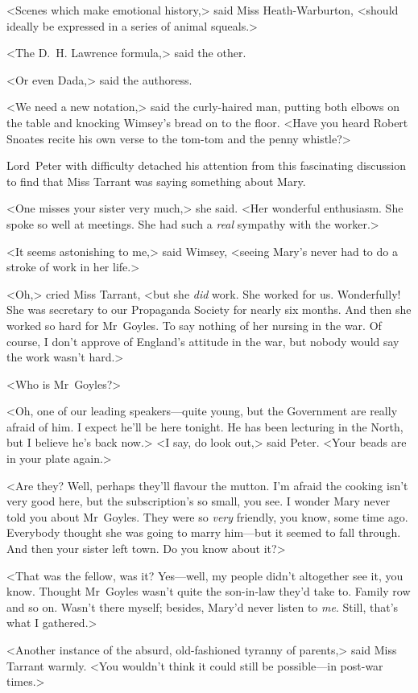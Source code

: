<Scenes which make emotional history,> said Miss Heath-Warburton, <should ideally be expressed in a series of animal squeals.>

<The D\@.~H\@. Lawrence formula,> said the other.

<Or even Dada,> said the authoress.

<We need a new notation,> said the curly-haired man, putting both elbows on the table and knocking Wimsey's bread on to the floor. <Have you heard Robert Snoates recite his own verse to the tom-tom and the penny whistle?>

Lord~Peter with difficulty detached his attention from this fascinating discussion to find that Miss Tarrant was saying something about Mary.

<One misses your sister very much,> she said. <Her wonderful enthusiasm. She spoke so well at meetings. She had such a \emph{real} sympathy with the worker.>

<It seems astonishing to me,> said Wimsey, <seeing Mary's never had to do a stroke of work in her life.>

<Oh,> cried Miss Tarrant, <but she \emph{did} work. She worked for us.  Wonderfully! She was secretary to our Propaganda Society for nearly six months. And then she worked so hard for Mr~Goyles. To say nothing of her nursing in the war. Of course, I don't approve of England's attitude in the war, but nobody would say the work wasn't hard.>

<Who is Mr~Goyles?>

<Oh, one of our leading speakers—quite young, but the Government are really afraid of him. I expect he'll be here tonight. He has been lecturing in the North, but I believe he's back now.>
<I say, do look out,> said Peter. <Your beads are in your plate again.>

<Are they? Well, perhaps they'll flavour the mutton. I'm afraid the cooking isn't very good here, but the subscription's so small, you see.  I wonder Mary never told you about Mr~Goyles. They were so \emph{very} friendly, you know, some time ago. Everybody thought she was going to marry him—but it seemed to fall through. And then your sister left town. Do you know about it?>

<That was the fellow, was it? Yes—well, my people didn't altogether see it, you know. Thought Mr~Goyles wasn't quite the son-in-law they'd take to. Family row and so on. Wasn't there myself; besides, Mary'd never listen to \emph{me}. Still, that's what I gathered.>

<Another instance of the absurd, old-fashioned tyranny of parents,> said Miss Tarrant warmly. <You wouldn't think it could still be possible—in post-war times.>

